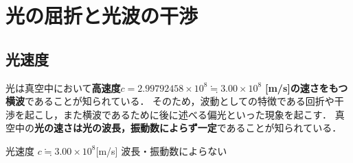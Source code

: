 \section{光の屈折と光波の干渉}


\setcounter{nombre}{19}

\subsection{光速度}
光は真空中において{\bf 高速度}\mbox{\boldmath $c=2.99792458\times 10^8 \fallingdotseq 3.00 \times 10^8$} {\bf [m/s]の速さをもつ横波}であることが知られている．
そのため，波動としての特徴である回折や干渉を起こし，また横波であるために後に述べる偏光といった現象を起こす．
真空中の{\bf 光の速さは光の波長，振動数によらず一定}であることが知られている．

 \begin{matome}{光速度}
 \hspace{3mm} $c\fallingdotseq 3.00\times 10^8$[m/s]\hspace{5mm} 波長・振動数によらない
 \end{matome}

